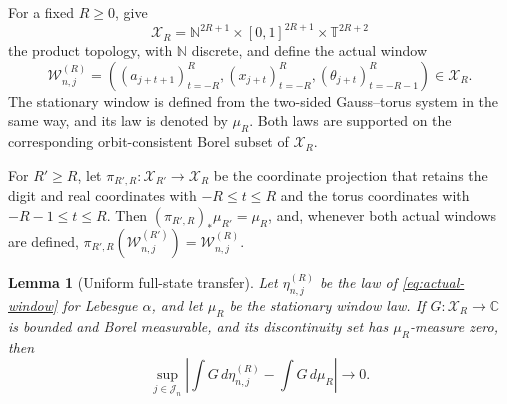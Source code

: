 \documentclass[11pt,a4paper]{amsart}
\newtheorem{lemma}[theorem]{Lemma}
\theoremstyle{definition}
\theoremstyle{remark}
\newcommand{\T}{\mathbb T}
\newcommand{\N}{\mathbb N}
\begin{document}
For a fixed $R\ge0$, give
\begin{equation}\label{eq:window-space}
 \mathcal X_R
 =\N^{2R+1}\times[0,1]^{2R+1}\times\T^{2R+2}
\end{equation}
the product topology, with $\N$ discrete, and define the actual window
\begin{equation}\label{eq:actual-window}
 \mathcal W_{n,j}^{(R)}=
 \left((a_{j+t+1})_{t=-R}^{R},
       (x_{j+t})_{t=-R}^{R},
       (\theta_{j+t})_{t=-R-1}^{R}\right)\in\mathcal X_R.
\end{equation}
The stationary window is defined from the two-sided Gauss--torus system in
the same way, and its law is denoted by $\mu_R$.  Both laws are supported on
the corresponding orbit-consistent Borel subset of $\mathcal X_R$.

For $R'\ge R$, let
$\pi_{R',R}:\mathcal X_{R'}\to\mathcal X_R$ be the coordinate projection
that retains the digit and real coordinates with $-R\le t\le R$ and the
torus coordinates with $-R-1\le t\le R$.  Then
$(\pi_{R',R})_*\mu_{R'}=\mu_R$, and, whenever both actual windows are
defined,
$\pi_{R',R}(\mathcal W_{n,j}^{(R')})=\mathcal W_{n,j}^{(R)}$.

\begin{lemma}[Uniform full-state transfer]\label{lem:full-state}
Let $\eta_{n,j}^{(R)}$ be the law of \eqref{eq:actual-window} for Lebesgue
$\alpha$, and let $\mu_R$ be the stationary window law.  If
$G:\mathcal X_R\to\mathbb C$ is bounded and Borel measurable, and its
discontinuity set has
$\mu_R$-measure zero, then
\begin{equation}\label{eq:full-state}
 \sup_{j\in\mathcal J_n}
 \left|\int G\,d\eta_{n,j}^{(R)}-\int G\,d\mu_R\right|\longrightarrow0.
\end{equation}
\end{lemma}
\end{document}
